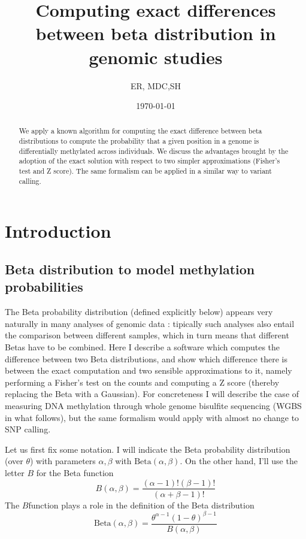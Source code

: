 \documentclass[11pt]{amsart}
\title{Computing exact differences between beta distribution in genomic studies}
\author{ER, MDC,SH}
\date{\today}
\begin{document}
\begin{abstract}
We apply a known algorithm for computing the exact difference between beta distributions
to compute the probability that a given position in a genome is differentially methylated across
individuals. We discuss the advantages brought by the adoption of the exact solution
with respect to two simpler approximations (Fisher's test and Z score).
The same formalism can be applied in a similar way to variant calling.
\end{abstract}
\maketitle
\section{Introduction}
\subsection{Beta distribution to model methylation probabilities}
The Beta probability distribution (defined explicitly below)  appears very naturally in many analyses of genomic data : tipically such analyses also entail the comparison between different samples, which in turn means that different Betas have to be combined. Here I describe a software which computes the difference between two Beta distributions, and show which difference there is between the exact computation and two sensible approximations to it, namely performing a Fisher's test on the counts and computing a Z score (thereby replacing the Beta with a Gaussian). For concreteness I will describe the case of measuring DNA methylation through whole genome bisulfite sequencing (WGBS in what follows), but the same formalism would apply with almost no change to SNP calling. 

Let us first fix some notation. I will indicate the Beta probability distribution (over $\theta$) with parameters $\alpha,\beta$ with $\mbox{Beta}(\alpha,\beta)$. On the other hand, I'll use the letter $B$ for the Beta function 
\[B(\alpha,\beta)=\frac{(\alpha-1)!(\beta-1)!}{(\alpha+\beta-1)!}\] The $B$function plays a role in the definition of the Beta distribution \[\mbox{Beta}(\alpha,\beta)=\frac{\theta^{\alpha-1}(1-\theta)^{\beta-1}}{B(\alpha,\beta)}\]
 
\end{document}
